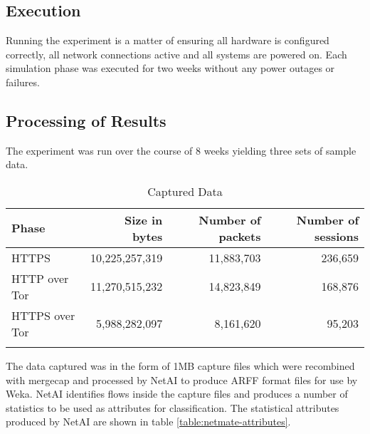 \subsection{Execution}

Running the experiment is a matter of ensuring all hardware is configured
correctly, all network connections active and all systems are powered on. Each
simulation phase was executed for two weeks without any power outages or
failures.

\subsection{Processing of Results}

The experiment was run over the course of 8 weeks yielding three sets of sample
data.

\begin{table}[H]
  \begin{tabular}{lrrr}
    \toprule
    Phase & Size in bytes & Number of packets & Number of sessions\\
    \midrule
    HTTPS & 10,225,257,319 & 11,883,703 & 236,659\\
    HTTP over Tor & 11,270,515,232 & 14,823,849 & 168,876\\
    HTTPS over Tor & 5,988,282,097 & 8,161,620 & 95,203\\
    \bottomrule
    \label{table:datasets}
  \end{tabular}
  \caption{Captured Data}
\end{table}

The data captured was in the form of 1MB capture files which were recombined
with mergecap and processed by NetAI to produce ARFF format files for use by
Weka. NetAI identifies flows inside the capture files and produces a number
of statistics to be used as attributes for classification. The statistical
attributes produced by NetAI are shown in table \ref{table:netmate-attributes}.

